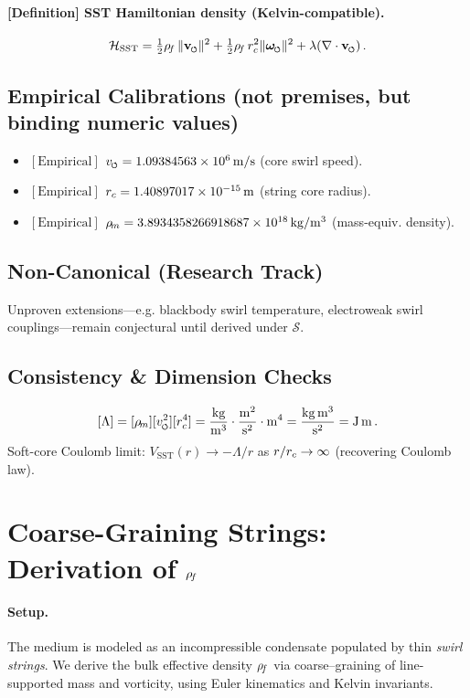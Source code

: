 \documentclass[11pt]{article}
\begin{document}
\paragraph{[Definition] SST Hamiltonian density (Kelvin-compatible).}
    \[
        \mathcal{H}_{\text{SST}} = \tfrac{1}{2}\rhof\,\|\vswirl\|^2 + \tfrac{1}{2}\rhof\,\rc^2\|\omegas\|^2 + \lambda(\nabla\cdot\vswirl)\,.
    \]

\subsection*{Empirical Calibrations (not premises, but binding numeric values)}
\begin{itemize}
\item $[\text{Empirical}] $ $\vscore = 1.09384563\times 10^6\,\mathrm{ m/s } $ (core swirl speed).
\item $[\text{Empirical}]$ $r_c = 1.40897017\times 10^{-15}\,\mathrm{m}$ (string core radius).
\item $[\text{Empirical}]$ $\rho_{\!m} = 3.8934358266918687\times 10^{18}\,\mathrm{kg/m^3}$ (mass-equiv. density).
\end{itemize}

\subsection*{Non-Canonical (Research Track)}
Unproven extensions—e.g. blackbody swirl temperature, electroweak swirl couplings—remain conjectural until derived under $\mathcal{S}$.

\subsection*{Consistency \& Dimension Checks}
\[
    [\Lambda] = [\rhom][\vscore^2][\rc^4]
    = \frac{\mathrm{kg}}{\mathrm{m^3}}\cdot\frac{\mathrm{m^2}}{\mathrm{s^2}}\cdot \mathrm{m^4}
    = \frac{\mathrm{kg\,m^3}}{\mathrm{s^2}}
    = \mathrm{J\,m}\,.
\]
Soft-core Coulomb limit: $V_{\text{SST}}(r)\to -\Lambda/r$ as $r/r_c\to\infty$ (recovering Coulomb law).

\section{Coarse-Graining Strings: Derivation of $\rho_{\!f}$}
\label{sec:canon_rhof_from_strings}
\paragraph{Setup.}
    The medium is modeled as an incompressible condensate populated by thin \emph{swirl strings}. We derive the bulk effective density $\rho_{\!f}$ via coarse–graining of line-supported mass and vorticity, using Euler kinematics and Kelvin invariants.
\end{document}
